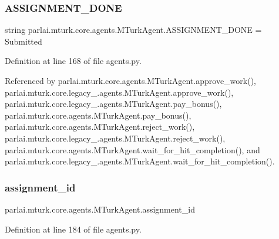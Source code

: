 \subsubsection{\texorpdfstring{A\+S\+S\+I\+G\+N\+M\+E\+N\+T\+\_\+\+D\+O\+NE}{ASSIGNMENT\_DONE}}
{\footnotesize\ttfamily string parlai.\+mturk.\+core.\+agents.\+M\+Turk\+Agent.\+A\+S\+S\+I\+G\+N\+M\+E\+N\+T\+\_\+\+D\+O\+NE = \textquotesingle{}Submitted\textquotesingle{}\hspace{0.3cm}{\ttfamily [static]}}



Definition at line 168 of file agents.\+py.



Referenced by parlai.\+mturk.\+core.\+agents.\+M\+Turk\+Agent.\+approve\+\_\+work(), parlai.\+mturk.\+core.\+legacy\+\_.\+agents.\+M\+Turk\+Agent.\+approve\+\_\+work(), parlai.\+mturk.\+core.\+legacy\+\_.\+agents.\+M\+Turk\+Agent.\+pay\+\_\+bonus(), parlai.\+mturk.\+core.\+agents.\+M\+Turk\+Agent.\+pay\+\_\+bonus(), parlai.\+mturk.\+core.\+agents.\+M\+Turk\+Agent.\+reject\+\_\+work(), parlai.\+mturk.\+core.\+legacy\+\_.\+agents.\+M\+Turk\+Agent.\+reject\+\_\+work(), parlai.\+mturk.\+core.\+agents.\+M\+Turk\+Agent.\+wait\+\_\+for\+\_\+hit\+\_\+completion(), and parlai.\+mturk.\+core.\+legacy\+\_.\+agents.\+M\+Turk\+Agent.\+wait\+\_\+for\+\_\+hit\+\_\+completion().

\mbox{\label{classparlai_1_1mturk_1_1core_1_1agents_1_1MTurkAgent_ada9c2a6ca3ee222f73743b2bc3a9d85f}} 
\subsubsection{\texorpdfstring{assignment\+\_\+id}{assignment\_id}}
{\footnotesize\ttfamily parlai.\+mturk.\+core.\+agents.\+M\+Turk\+Agent.\+assignment\+\_\+id}



Definition at line 184 of file agents.\+py.



